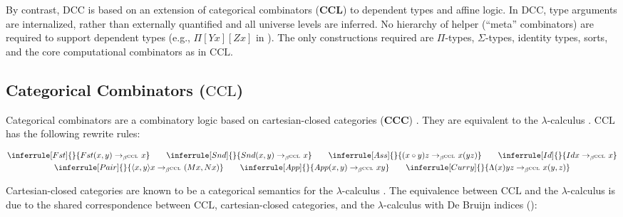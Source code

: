\documentclass{article}
\newcommand{\cccbf}{\(\textbf{CCC}\)} %
\newcommand{\ccl}{\(\text{CCL}\)} %
\newcommand{\cclbf}{\(\textbf{CCL}\)} %
\newcommand{\ccle}{\text{CCL}}
\newcommand{\la}{\langle}
\newcommand{\ra}{\rangle}
\newcommand{\arr}{\rightarrow}
\newcommand{\barrc}[1]{\arr_{\beta^{#1}}}
\begin{document}
By contrast, DCC is based on an extension of categorical combinators (\cclbf) to dependent types and affine logic. In DCC, type arguments are internalized, rather than externally quantified and all universe levels are inferred. No hierarchy of helper (``meta'' combinators) are required to support dependent types (e.g., \(\Pi[Y x][Z x]\) in \autocite[10:17][lines 5-7]{altenkirch}). The only constructions required are \(\Pi\)-types, \(\Sigma\)-types, identity types, sorts, and the core computational combinators as in \ccl{}.

\subsection{Categorical Combinators (\ccl)}

Categorical combinators \cite{cmachine} \cite{CURIEN1986188} are a combinatory logic based on cartesian-closed categories (\cccbf) \cite{nlab:ccc}. They are equivalent to the \(\lambda\)-calculus \autocite[p. 205][theorem 2.20]{CURIEN1986188}. \ccl{} has the following rewrite rules:

\begin{gather*}
  \inferrule[Fst]
  { }
  { Fst (x, y) \barrc{\ccle} x} \qquad
  \inferrule[Snd]
  { }
  { Snd (x, y) \barrc{\ccle} x} \qquad
  \inferrule[Ass]
  { }
  {(x \circ y) z \barrc{\ccle} x (y z)}\qquad
  \inferrule[Id]
  { }
  {Id x \barrc{\ccle} x}\\
  \inferrule[Pair]
  { }
  {\la x, y \ra x \barrc{\ccle} (M x, N x)}\qquad
  \inferrule[App]
  { }
  { App (x, y) \barrc{\ccle} x y}\qquad
  \inferrule[Curry]
  { }
  { \Lambda(x) y z \barrc{\ccle} x (y, z)}
\end{gather*}

Cartesian-closed categories are known to be a categorical semantics for the \(\lambda\)-calculus \cite{lambek1988introduction}. The equivalence between \ccl{} and the \(\lambda\)-calculus \autocite[p. 205][theorem 2.20]{CURIEN1986188} is due to the shared correspondence \autocite[p. 6]{cmachine} between \ccl, cartesian-closed categories, and the \(\lambda\)-calculus with De Bruijn indices (\cite{de1972lambda}):
\end{document}
